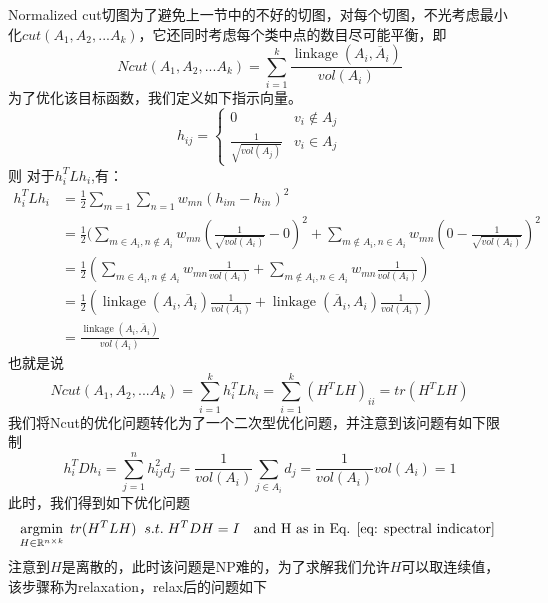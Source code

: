 Normalized cut切图为了避免上一节中的不好的切图，对每个切图，不光考虑最小化$cut(A_1,A_2,...A_k)$，它还同时考虑每个类中点的数目尽可能平衡，即
\begin{equation*}
Ncut(A_1,A_2,...A_k) = \sum\limits_{i=1}^{k}\frac{\operatorname{linkage}(A_i, \overline{A}_i )}{vol(A_i)}
\end{equation*}
为了优化该目标函数，我们定义如下指示向量。
\begin{equation}
\label{eq: spectral indicator}
h_{ij}= \begin{cases} 0& { v_i \notin A_j}\\ \frac{1}{\sqrt{vol(A_j)}}& { v_i \in A_j} \end{cases}
\end{equation}
则
对于$h_i^TLh_i$,有：
\begin{align} h_i^TLh_i & = \frac{1}{2}\sum\limits_{m=1}\sum\limits_{n=1}w_{mn}(h_{im}-h_{in})^2 \\& =\frac{1}{2}(\sum\limits_{m \in A_i, n \notin A_i}w_{mn}(\frac{1}{\sqrt{vol(A_i)}} - 0)^2 +  \sum\limits_{m \notin A_i, n \in A_i}w_{mn}(0 - \frac{1}{\sqrt{vol(A_i)}} )^2\\& = \frac{1}{2}(\sum\limits_{m \in A_i, n \notin A_i}w_{mn}\frac{1}{vol(A_i)} +  \sum\limits_{m \notin A_i, n \in A_i}w_{mn}\frac{1}{vol(A_i)})\\& = \frac{1}{2}(\operatorname{linkage}(A_i, \overline{A}_i) \frac{1}{vol(A_i)} + \operatorname{linkage}(\overline{A}_i, A_i) \frac{1}{vol(A_i)}) \\& =  \frac{\operatorname{linkage}(A_i, \overline{A}_i)}{vol(A_i)} 
\end{align}
也就是说
\begin{equation*}
Ncut(A_1,A_2,...A_k) = \sum\limits_{i=1}^{k}h_i^TLh_i = \sum\limits_{i=1}^{k}(H^TLH)_{ii} = tr(H^TLH)
\end{equation*}
我们将Ncut的优化问题转化为了一个二次型优化问题，并注意到该问题有如下限制
\begin{equation*}
h_i^TDh_i = \sum\limits_{j=1}^{n}h_{ij}^2d_j =\frac{1}{vol(A_i)}\sum\limits_{j \in A_i}d_j= \frac{1}{vol(A_i)}vol(A_i) =1
\end{equation*}
此时，我们得到如下优化问题
\begin{equation}
\label{eq: ori_spectral_clustering}
\operatorname*{argmin}\limits_{H \in \mathbb{R}^{n \times k}} \; tr(H^TLH) \;\; s.t.\;H^TDH=I \quad \text{and H as in Eq. \ref{eq: spectral indicator} }
\end{equation}
注意到$H$是离散的，此时该问题是NP难的，为了求解我们允许$H$可以取连续值，该步骤称为relaxation，relax后的问题如下
